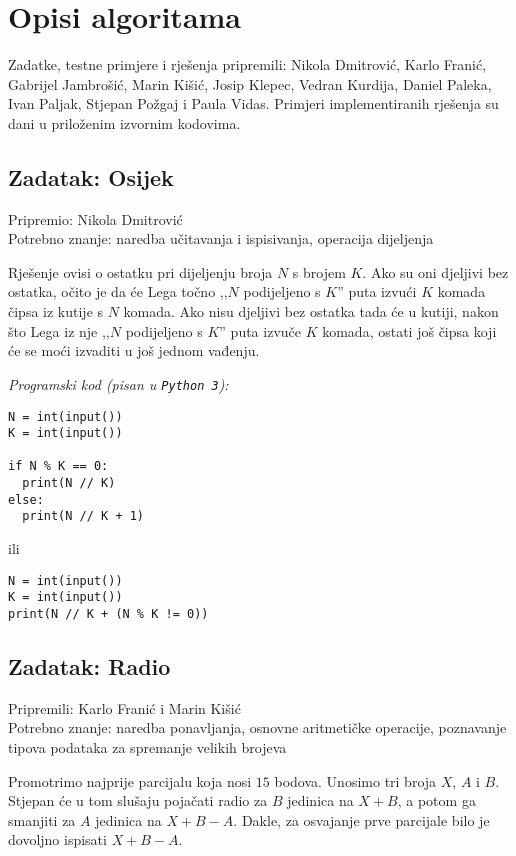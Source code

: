 \documentclass[a4paper]{article}
\begin{document}
\section*{Opisi algoritama}
Zadatke, testne primjere i rješenja pripremili: Nikola Dmitrović, Karlo Franić,
Gabrijel Jambrošić, Marin Kišić, Josip Klepec, Vedran Kurdija, Daniel Paleka,
Ivan Paljak, Stjepan Požgaj i Paula Vidas. Primjeri implementiranih rješenja su
dani u priloženim izvornim kodovima.

\subsection*{Zadatak: Osijek}
\textsf{Pripremio: Nikola Dmitrović}\\
\textsf{Potrebno znanje: naredba učitavanja i ispisivanja, operacija dijeljenja}

Rješenje ovisi o ostatku pri dijeljenju broja $N$ s brojem $K$. Ako su oni
djeljivi bez ostatka, očito je da će Lega točno ,,$N$ podijeljeno s $K$'' puta
izvući $K$ komada čipsa iz kutije s $N$ komada. Ako nisu djeljivi bez ostatka
tada će u kutiji, nakon što Lega iz nje ,,$N$ podijeljeno s $K$'' puta izvuče
$K$ komada, ostati još čipsa koji će se moći izvaditi u još jednom vađenju.

\textit{Programski kod (pisan u \texttt{Python 3}):}

\vspace{-2ex}
\begin{verbatim}
N = int(input())
K = int(input())

if N % K == 0:
  print(N // K)
else:
  print(N // K + 1)
\end{verbatim}

ili

\begin{verbatim}
N = int(input())
K = int(input())
print(N // K + (N % K != 0))
\end{verbatim}

\subsection*{Zadatak: Radio}
\textsf{Pripremili: Karlo Franić i Marin Kišić}\\
\textsf{Potrebno znanje: naredba ponavljanja, osnovne aritmetičke operacije,
poznavanje tipova podataka za spremanje velikih brojeva}

Promotrimo najprije parcijalu koja nosi $15$ bodova. Unosimo tri broja $X$, $A$
i $B$.  Stjepan će u tom slušaju pojačati radio za $B$ jedinica na $X + B$, a
potom ga smanjiti za $A$ jedinica na $X + B - A$. Dakle, za osvajanje prve
parcijale bilo je dovoljno ispisati $X + B - A$.
\end{document}
